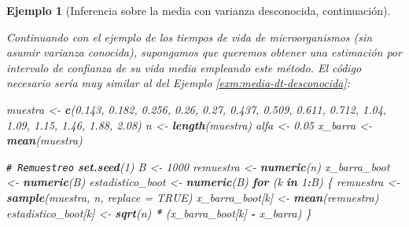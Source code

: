 \documentclass[
]{book}
\newenvironment{Shaded}{\begin{snugshade}}{\end{snugshade}}
\newcommand{\AttributeTok}[1]{\textcolor[rgb]{0.13,0.29,0.53}{#1}}
\newcommand{\CommentTok}[1]{\textcolor[rgb]{0.56,0.35,0.01}{\textit{#1}}}
\newcommand{\ConstantTok}[1]{\textcolor[rgb]{0.56,0.35,0.01}{#1}}
\newcommand{\ControlFlowTok}[1]{\textcolor[rgb]{0.13,0.29,0.53}{\textbf{#1}}}
\newcommand{\DecValTok}[1]{\textcolor[rgb]{0.00,0.00,0.81}{#1}}
\newcommand{\FloatTok}[1]{\textcolor[rgb]{0.00,0.00,0.81}{#1}}
\newcommand{\FunctionTok}[1]{\textcolor[rgb]{0.13,0.29,0.53}{\textbf{#1}}}
\newcommand{\NormalTok}[1]{#1}
\newcommand{\OtherTok}[1]{\textcolor[rgb]{0.56,0.35,0.01}{#1}}
\newcommand{\SpecialCharTok}[1]{\textcolor[rgb]{0.81,0.36,0.00}{\textbf{#1}}}
\theoremstyle{break}
\newtheorem{example}{Ejemplo}[chapter]
\theoremstyle{nonumberplain}
\renewcommand{\CommentTok}[1]{\textcolor[rgb]{0.41,0.41,0.41}{\texttt{#1}}}
\begin{document}
\begin{example}[Inferencia sobre la media con varianza desconocida, continuación]
\protect\hypertarget{exm:media-dt-desconocida-perc}{}\label{exm:media-dt-desconocida-perc}

\vspace{0.5cm}

Continuando con el ejemplo de los tiempos de vida de microorganismos
(sin asumir varianza conocida),
supongamos que queremos obtener una estimación por intervalo de confianza
de su vida media empleando este método.
El código necesario sería muy similar al del Ejemplo \ref{exm:media-dt-desconocida}:

\begin{Shaded}
\begin{Highlighting}[]
\NormalTok{muestra }\OtherTok{\textless{}{-}} \FunctionTok{c}\NormalTok{(}\FloatTok{0.143}\NormalTok{, }\FloatTok{0.182}\NormalTok{, }\FloatTok{0.256}\NormalTok{, }\FloatTok{0.26}\NormalTok{, }\FloatTok{0.27}\NormalTok{, }\FloatTok{0.437}\NormalTok{, }\FloatTok{0.509}\NormalTok{, }
             \FloatTok{0.611}\NormalTok{, }\FloatTok{0.712}\NormalTok{, }\FloatTok{1.04}\NormalTok{, }\FloatTok{1.09}\NormalTok{, }\FloatTok{1.15}\NormalTok{, }\FloatTok{1.46}\NormalTok{, }\FloatTok{1.88}\NormalTok{, }\FloatTok{2.08}\NormalTok{)}
\NormalTok{n }\OtherTok{\textless{}{-}} \FunctionTok{length}\NormalTok{(muestra)}
\NormalTok{alfa }\OtherTok{\textless{}{-}} \FloatTok{0.05}
\NormalTok{x\_barra }\OtherTok{\textless{}{-}} \FunctionTok{mean}\NormalTok{(muestra)}

\CommentTok{\# Remuestreo}
\FunctionTok{set.seed}\NormalTok{(}\DecValTok{1}\NormalTok{)}
\NormalTok{B }\OtherTok{\textless{}{-}} \DecValTok{1000}
\NormalTok{remuestra }\OtherTok{\textless{}{-}} \FunctionTok{numeric}\NormalTok{(n)}
\NormalTok{x\_barra\_boot }\OtherTok{\textless{}{-}} \FunctionTok{numeric}\NormalTok{(B) }
\NormalTok{estadistico\_boot }\OtherTok{\textless{}{-}} \FunctionTok{numeric}\NormalTok{(B)}
\ControlFlowTok{for}\NormalTok{ (k }\ControlFlowTok{in} \DecValTok{1}\SpecialCharTok{:}\NormalTok{B) \{}
\NormalTok{  remuestra }\OtherTok{\textless{}{-}} \FunctionTok{sample}\NormalTok{(muestra, n, }\AttributeTok{replace =} \ConstantTok{TRUE}\NormalTok{)}
\NormalTok{  x\_barra\_boot[k] }\OtherTok{\textless{}{-}} \FunctionTok{mean}\NormalTok{(remuestra)}
\NormalTok{  estadistico\_boot[k] }\OtherTok{\textless{}{-}} \FunctionTok{sqrt}\NormalTok{(n) }\SpecialCharTok{*}\NormalTok{ (x\_barra\_boot[k] }\SpecialCharTok{{-}}\NormalTok{ x\_barra)}
\NormalTok{\}}


\end{Highlighting}
\end{Shaded}
\end{example}
\end{document}
